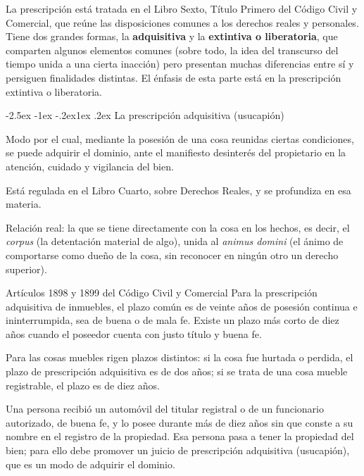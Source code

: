 \documentclass[12pt,oneside]{book}
\makeatletter
\renewcommand\subsection{\@startsection{subsection}{2}{\z@}%
  {-2.5ex \@plus -1ex \@minus -.2ex}{1ex \@plus .2ex}%
  {\normalfont\normalsize\bfseries}}
\makeatother
\begin{document}
La prescripción está tratada en el Libro Sexto, Título Primero del Código Civil y Comercial, que reúne las disposiciones comunes a los derechos reales y personales. Tiene dos grandes formas, la \textbf{adquisitiva} y la \textbf{extintiva o liberatoria}, que comparten algunos elementos comunes (sobre todo, la idea del transcurso del tiempo unida a una cierta inacción) pero presentan muchas diferencias entre sí y persiguen finalidades distintas. El énfasis de esta parte está en la prescripción extintiva o liberatoria.

\subsection{La prescripción adquisitiva (usucapión)}

\begin{definicion}
Modo por el cual, mediante la posesión de una cosa reunidas ciertas condiciones, se puede adquirir el dominio, ante el manifiesto desinterés del propietario en la atención, cuidado y vigilancia del bien.
\end{definicion}

Está regulada en el Libro Cuarto, sobre Derechos Reales, y se profundiza en esa materia.

\begin{definicion}[{Posesión}]
Relación real: la que se tiene directamente con la cosa en los hechos, es decir, el \textit{corpus} (la detentación material de algo), unida al \textit{animus domini} (el ánimo de comportarse como dueño de la cosa, sin reconocer en ningún otro un derecho superior).
\end{definicion}

\begin{articulo}{Artículos 1898 y 1899 del Código Civil y Comercial}
Para la prescripción adquisitiva de inmuebles, el plazo común es de veinte años de posesión continua e ininterrumpida, sea de buena o de mala fe. Existe un plazo más corto de diez años cuando el poseedor cuenta con justo título y buena fe.
\end{articulo}

Para las cosas muebles rigen plazos distintos: si la cosa fue hurtada o perdida, el plazo de prescripción adquisitiva es de dos años; si se trata de una cosa mueble registrable, el plazo es de diez años.

\begin{ejemplo}
Una persona recibió un automóvil del titular registral o de un funcionario autorizado, de buena fe, y lo posee durante más de diez años sin que conste a su nombre en el registro de la propiedad. Esa persona pasa a tener la propiedad del bien; para ello debe promover un juicio de prescripción adquisitiva (usucapión), que es un modo de adquirir el dominio.
\end{ejemplo}
\end{document}
